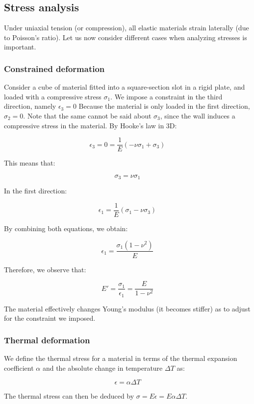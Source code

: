 \documentclass{article}
\begin{document}
\subsection{Stress analysis}

Under uniaxial tension (or compression), all elastic materials strain laterally (due to Poisson's ratio). Let us now consider different cases when analyzing stresses is important.

\subsubsection{Constrained deformation}

\begin{proposition}
    Consider a cube of material fitted into a square-section slot in a rigid plate, and loaded with a compressive stress $\sigma_1$. We impose a constraint in the third direction, namely $\epsilon_3 = 0$ Because the material is only loaded in the first direction, $\sigma_2 = 0$. Note that the same cannot be said about $\sigma_3$, since the wall induces a compressive stress in the material. By Hooke's law in 3D:

    \[ \epsilon_3 = 0 = \frac{1}{E}(-\nu\sigma_1 + \sigma_3) \]

    This means that:

    \[ \sigma_3 = \nu\sigma_1 \]

    In the first direction:

    \[ \epsilon_1 = \frac{1}{E}(\sigma_1 - \nu\sigma_3) \]

    By combining both equations, we obtain:

    \[ \epsilon_1 = \frac{\sigma_1(1 - \nu^2)}{E} \]

    Therefore, we observe that:

    \[ E' = \frac{\sigma_1}{\epsilon_1} = \frac{E}{1 - \nu^2} \]

    The material effectively changes Young's modulus (it becomes stiffer) as to adjust for the constraint we imposed.
\end{proposition}

\subsubsection{Thermal deformation}

\begin{proposition}
    We define the thermal stress for a material in terms of the thermal expansion coefficient $\alpha$ and the absolute change in temperature $\Delta T$ as:

    \[ \epsilon = \alpha\Delta T \]

    The thermal stress can then be deduced by $\sigma = E\epsilon = E\alpha\Delta T$.
\end{proposition}
\end{document}
